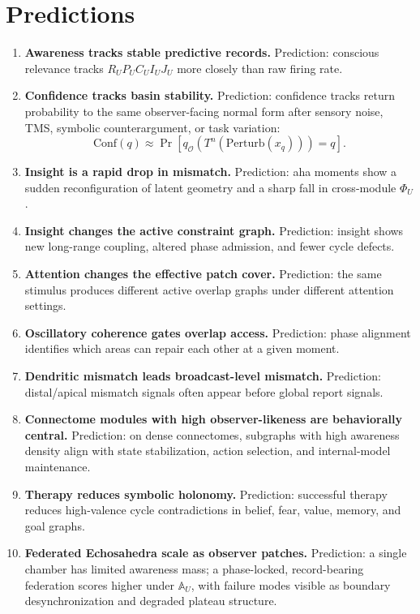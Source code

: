 \documentclass[11pt]{article}
\theoremstyle{remark}
\theoremstyle{plain}
\begin{document}
\section{Predictions}

\begin{enumerate}
\item \textbf{Awareness tracks stable predictive records.} Prediction: conscious relevance tracks \(R_U P_U C_U I_U J_U\) more closely than raw firing rate.
\item \textbf{Confidence tracks basin stability.} Prediction: confidence tracks return probability to the same observer-facing normal form after sensory noise, TMS, symbolic counterargument, or task variation:
\[
\mathrm{Conf}(q)\approx
\Pr\!\left[q_{\mathcal O}(T^n(\mathrm{Perturb}(x_q)))=q\right].
\]
\item \textbf{Insight is a rapid drop in mismatch.} Prediction: aha moments show a sudden reconfiguration of latent geometry and a sharp fall in cross-module \(\Phi_U\).
\item \textbf{Insight changes the active constraint graph.} Prediction: insight shows new long-range coupling, altered phase admission, and fewer cycle defects.
\item \textbf{Attention changes the effective patch cover.} Prediction: the same stimulus produces different active overlap graphs under different attention settings.
\item \textbf{Oscillatory coherence gates overlap access.} Prediction: phase alignment identifies which areas can repair each other at a given moment.
\item \textbf{Dendritic mismatch leads broadcast-level mismatch.} Prediction: distal/apical mismatch signals often appear before global report signals.
\item \textbf{Connectome modules with high observer-likeness are behaviorally central.} Prediction: on dense connectomes, subgraphs with high awareness density align with state stabilization, action selection, and internal-model maintenance.
\item \textbf{Therapy reduces symbolic holonomy.} Prediction: successful therapy reduces high-valence cycle contradictions in belief, fear, value, memory, and goal graphs.
\item \textbf{Federated Echosahedra scale as observer patches.} Prediction: a single chamber has limited awareness mass; a phase-locked, record-bearing federation scores higher under \(\mathbb A_U\), with failure modes visible as boundary desynchronization and degraded plateau structure.

\end{enumerate}
\end{document}

